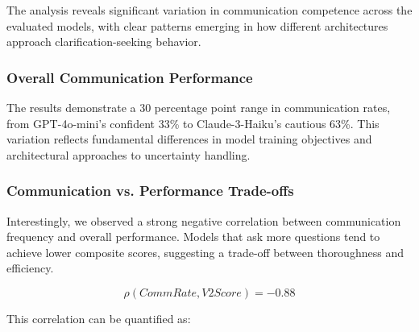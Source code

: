 \documentclass[conference]{IEEEtran}
\begin{document}
The analysis reveals significant variation in communication competence across the evaluated models, with clear patterns emerging in how different architectures approach clarification-seeking behavior.

\subsubsection{Overall Communication Performance}

\begin{table}[ht]
\centering
\small
\caption{Communication Competence Results Across Models}
\label{tab:communication_results}
\end{table}

The results demonstrate a 30 percentage point range in communication rates, from GPT-4o-mini's confident 33\% to Claude-3-Haiku's cautious 63\%. This variation reflects fundamental differences in model training objectives and architectural approaches to uncertainty handling.

\subsubsection{Communication vs. Performance Trade-offs}

Interestingly, we observed a strong negative correlation between communication frequency and overall performance. Models that ask more questions tend to achieve lower composite scores, suggesting a trade-off between thoroughness and efficiency.

\begin{equation}
    \mathit{\rho}(\mathit{CommRate}, \mathit{V2Score}) = -0.88
\end{equation}

This correlation can be quantified as:
\end{document}
